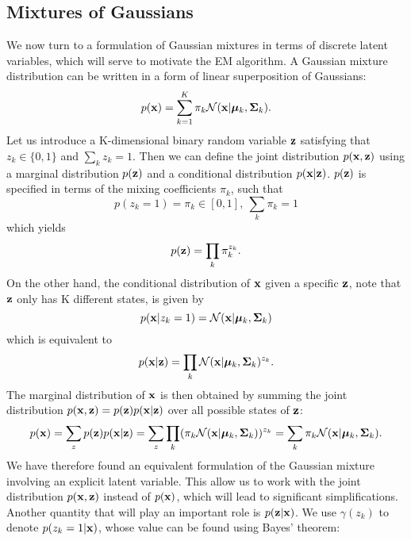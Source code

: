 \documentclass[../main.tex]{subfiles}
\begin{document}
\subsection{Mixtures of Gaussians}
We now turn to a formulation of Gaussian mixtures in terms of discrete latent variables, which will serve to motivate the EM algorithm. A Gaussian mixture distribution can be written in a form of linear superposition of Gaussians:
\begin{equation*}
p({\bf x})=\sum_{k=1}^{K} \pi_k \mathcal{N}({\bf x}|\bm{\mu}_k, {\bf\Sigma}_k).
\end{equation*}
Let us introduce a K-dimensional binary random variable ${\bf z}$ satisfying that $z_k\in \{0,1\}$ and $\sum_k z_k=1$. Then we can define the joint distribution $p({\bf x,z})$ using a marginal distribution $p({\bf z})$ and a conditional distribution $p({\bf x}|{\bf z})$. $p({\bf z})$ is specified in terms of the mixing coefficients $\pi_k$, such that
\begin{equation*}
p(z_k=1)=\pi_k \in [0,1],\ \sum_k\pi_k=1
\end{equation*}
which yields
\begin{equation*}
p({\bf z})=\prod_{k}\pi_k^{z_k}.
\end{equation*}
On the other hand, the conditional distribution of ${\bf x}$ given a specific ${\bf z}$, note that ${\bf z}$ only has K different states, is given by
\begin{equation*}
p({\bf x}|z_k=1)=\mathcal{N}({\bf x}|\bm{\mu}_k,{\bf \Sigma}_k)
\end{equation*}
which is equivalent to
\begin{equation*}
p({\bf x}|{\bf z}) = \prod_k \mathcal{N}({\bf x}|\bm{\mu}_k,{\bf \Sigma}_k)^{z_k}.
\end{equation*}
The marginal distribution of ${\bf x}$ is then obtained by summing the joint distribution $p({\bf x,z})=p({\bf z})p({\bf x}|{\bf z})$ over all possible states of ${\bf z}$:
\begin{equation*}
p({\bf x}) = \sum_z p({\bf z})p({\bf x}|{\bf z}) =  \sum_z \prod_k (\pi_k \mathcal{N}({\bf x}|\bm{\mu}_k,{\bf \Sigma}_k))^{z_k} = \sum_{k} \pi_k \mathcal{N}({\bf x}|\bm{\mu}_k, {\bf\Sigma}_k).
\end{equation*}
We have therefore found an equivalent formulation of the Gaussian mixture involving an explicit latent variable. This allow us to work with the joint distribution $p({\bf x, z})$ instead of $p({\bf x})$, which will lead to significant simplifications. Another quantity that will play an important role is $p({\bf z|x})$. We use $\gamma(z_k)$ to denote $p(z_k=1|{\bf x})$, whose value can be found using Bayes' theorem:
\end{document}
